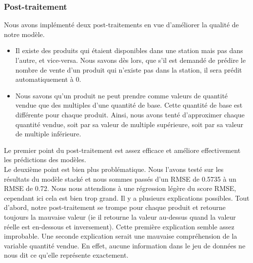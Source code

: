 \documentclass{article} %
\begin{document}
\subsubsection{Post-traitement}
Nous avons implémenté deux post-traitements en vue d'améliorer la qualité de notre modèle.
\begin{itemize}
	\item Il existe des produits qui étaient disponibles dans une station mais pas dans l'autre, et vice-versa. Nous savons dès lors, que s'il est demandé de prédire le nombre de vente d'un produit qui n'existe pas dans la station, il sera prédit automatiquement à 0.
	\item Nous savons qu'un produit ne peut prendre comme valeurs de quantité vendue que des multiples d'une quantité de base. Cette quantité de base est différente pour chaque produit. Ainsi, nous avons tenté d'approximer chaque quantité vendue, soit par sa valeur de multiple supérieure, soit par sa valeur de multiple inférieure. 
\end{itemize}
Le premier point du post-traitement est assez efficace et améliore effectivement les prédictions des modèles.\\
Le deuxième point est bien plus problématique. Nous l'avons testé  sur les résultats du modèle stacké et nous sommes passés d'un RMSE de 0.5735 à un RMSE de 0.72. Nous nous attendions à une régression légère du score RMSE, cependant ici cela est bien trop grand. Il y a plusieurs explications possibles. Tout d'abord, notre post-traitement se trompe pour chaque produit et retourne toujours la mauvaise valeur (ie il retourne la valeur au-dessus quand la valeur réelle est en-dessous et inversement). Cette première explication semble assez improbable. Une seconde explication serait une mauvaise compréhension de la variable quantité vendue. En effet, aucune information dans le jeu de données ne nous dit ce qu'elle représente exactement.
\end{document}

